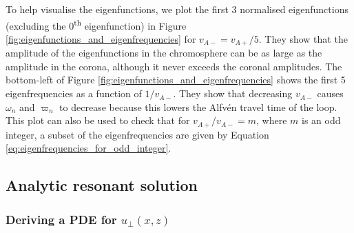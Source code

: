 To help visualise the eigenfunctions, we plot the first 3 normalised eigenfunctions (excluding the 0\textsuperscript{th} eigenfunction) in Figure \ref{fig:eigenfunctions_and_eigenfrequencies} for $v_{A-}=v_{A+}/5$. They show that the amplitude of the eigenfunctions in the chromosphere can be as large as the amplitude in the corona, although it never exceeds the coronal amplitudes. The bottom-left of Figure \ref{fig:eigenfunctions_and_eigenfrequencies} shows the first 5 eigenfrequencies as a function of $1/v_{A-}$. They show that decreasing $v_{A-}$ causes $\omega_n$ and $\varpi_n$ to decrease because this lowers the Alfv\'en travel time of the loop. This plot can also be used to check that for $v_{A+}/v_{A-}=m$, where $m$ is an odd integer, a subset of the eigenfrequencies are given by Equation \eqref{eq:eigenfrequencies_for_odd_integer}.

\subsection{Analytic resonant solution}
\label{sec:oblique_field_resonant_absorption_analytic_soln}

\subsubsection{Deriving a PDE for $u_\perp(x,z)$}

